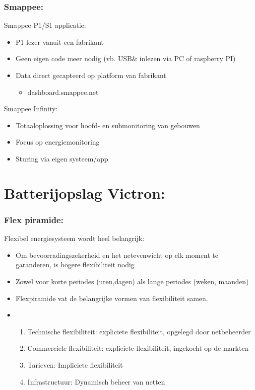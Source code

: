 \documentclass[12pt]{article}
\begin{document}
\subsubsection{Smappee:}
Smappee P1/S1 applicatie:
\begin{itemize}
    \item P1 lezer vanuit een fabrikant
    \item Geen eigen code meer nodig (vb. USB\& inlezen via PC of raspberry PI)
    \item Data direct gecapteerd op platform van fabrikant\begin{itemize}
        \item dashboard.smappee.net
    \end{itemize}
\end{itemize}
Smappee Infinity:
\begin{itemize}
    \item Totaaloplossing voor hoofd- en submonitoring van gebouwen
    \item Focus op energiemonitoring
    \item Sturing via eigen systeem/app
\end{itemize}
\section{Batterijopslag Victron:}
\subsubsection{Flex piramide:}
Flexibel energiesysteem wordt heel belangrijk:\begin{itemize}
    \item Om bevoorradingszekerheid en het netevenwicht op elk moment te garanderen, is hogere flexibiliteit nodig
    \item Zowel voor korte periodes (uren,dagen) als lange periodes (weken, maanden)
    \item Flexpiramide vat de belangrijke vormen van flexibiliteit samen.
    \item[]\begin{enumerate}
        \item Technische flexibiliteit: expliciete flexibiliteit, opgelegd door netbeheerder 
        \item Commerciele flexibiliteit: expliciete flexibiliteit, ingekocht op de markten 
        \item Tarieven: Impliciete flexibiliteit
        \item Infrastructuur: Dynamisch beheer van netten 
    \end{enumerate}
\end{itemize}
\end{document}
